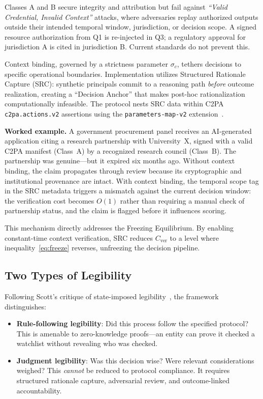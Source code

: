 \documentclass[runningheads]{llncs}
\begin{document}
Classes A and B secure integrity and attribution but fail against \emph{``Valid Credential, Invalid Context''} attacks, where adversaries replay authorized outputs outside their intended temporal window, jurisdiction, or decision scope. A signed resource authorization from Q1 is re-injected in Q3; a regulatory approval for jurisdiction A is cited in jurisdiction B. Current standards do not prevent this.

Context binding, governed by a strictness parameter $\sigma_c$, tethers decisions to specific operational boundaries. Implementation utilizes Structured Rationale Capture (SRC): synthetic principals commit to a reasoning path \emph{before} outcome realization, creating a ``Decision Anchor'' that makes post-hoc rationalization computationally infeasible. The protocol nests SRC data within C2PA \texttt{c2pa.actions.v2} assertions using the \texttt{parameters-map-v2} extension~\cite{c2pa2024}.

\textbf{Worked example.} A government procurement panel receives an AI-generated application citing a research partnership with University~X, signed with a valid C2PA manifest (Class~A) by a recognized research council (Class~B). The partnership was genuine---but it expired six months ago. Without context binding, the claim propagates through review because its cryptographic and institutional provenance are intact. With context binding, the temporal scope tag in the SRC metadata triggers a mismatch against the current decision window: the verification cost becomes $O(1)$ rather than requiring a manual check of partnership status, and the claim is flagged before it influences scoring.

This mechanism directly addresses the Freezing Equilibrium. By enabling constant-time context verification, SRC reduces $C_{\mathrm{ver}}$ to a level where inequality~\eqref{eq:freeze} reverses, unfreezing the decision pipeline.

\subsection{Two Types of Legibility}

Following Scott's critique of state-imposed legibility~\cite{scott1998seeing,rao2010legibility}, the framework distinguishes:

\begin{itemize}
\item \textbf{Rule-following legibility}: Did this process follow the specified protocol? This is amenable to zero-knowledge proofs---an entity can prove it checked a watchlist without revealing who was checked.
\item \textbf{Judgment legibility}: Was this decision wise? Were relevant considerations weighed? This \emph{cannot} be reduced to protocol compliance. It requires structured rationale capture, adversarial review, and outcome-linked accountability.
\end{itemize}
\end{document}
